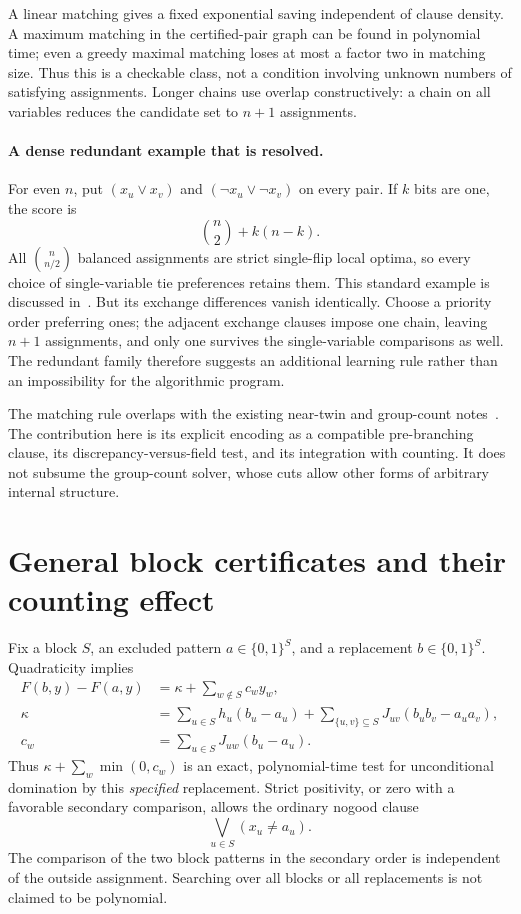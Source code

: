 \documentclass[11pt,a4paper]{article}
\theoremstyle{remark}
\begin{document}
A linear matching gives a fixed exponential saving independent of
clause density. A maximum matching in the certified-pair graph can be
found in polynomial time; even a greedy maximal matching loses at most
a factor two in matching size. Thus this is a checkable class, not a
condition involving unknown numbers of satisfying assignments.
Longer chains use overlap constructively: a chain on all variables
reduces the candidate set to $n+1$ assignments.

\paragraph{A dense redundant example that is resolved.}
For even $n$, put $(x_u\lor x_v)$ and $(\neg x_u\lor\neg x_v)$ on
every pair. If $k$ bits are one, the score is
\[
 \binom n2+k(n-k).
\]
All $\binom n{n/2}$ balanced assignments are strict single-flip local
optima, so every choice of single-variable tie preferences retains them.
This standard example is discussed in~\cite{Hastings}. But its exchange
differences vanish identically. Choose a priority order preferring ones;
the adjacent exchange clauses impose one chain, leaving $n+1$ assignments,
and only one survives the single-variable comparisons as well.
The redundant family therefore suggests an additional learning rule
rather than an impossibility for the algorithmic program.

The matching rule overlaps with the existing near-twin and group-count
notes~\cite{Near,Groups}. The contribution here is its explicit encoding
as a compatible pre-branching clause, its discrepancy-versus-field test,
and its integration with counting. It does not subsume the group-count
solver, whose cuts allow other forms of arbitrary internal structure.

\section{General block certificates and their counting effect}

Fix a block $S$, an excluded pattern $a\in\{0,1\}^S$, and a replacement
$b\in\{0,1\}^S$. Quadraticity implies
\begin{align}
 F(b,y)-F(a,y)&=\kappa+\sum_{w\notin S}c_wy_w,\nonumber\\
 \kappa&=\sum_{u\in S}h_u(b_u-a_u)
       +\sum_{\{u,v\}\subseteq S}J_{uv}(b_ub_v-a_ua_v),\nonumber\\
 c_w&=\sum_{u\in S}J_{uw}(b_u-a_u).              \label{eq:block}
\end{align}
Thus $\kappa+\sum_w\min(0,c_w)$ is an exact, polynomial-time test
for unconditional domination by this \emph{specified} replacement.
Strict positivity, or zero with a favorable secondary comparison,
allows the ordinary nogood clause
\[
 \bigvee_{u\in S}(x_u\ne a_u).
\]
The comparison of the two block patterns in the secondary order is
independent of the outside assignment. Searching over all blocks or all
replacements is not claimed to be polynomial.
\end{document}
